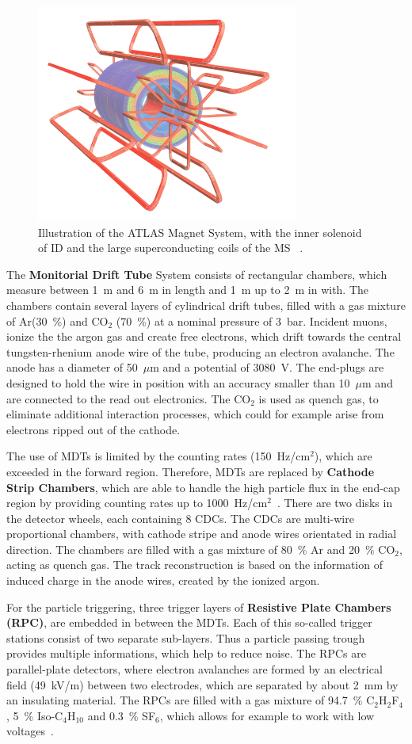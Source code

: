 \begin{figure}[h]
	\centering
	\includegraphics[width=0.4\linewidth]{Pics/cp3/37}
	\caption{Illustration of the ATLAS Magnet System, with the inner solenoid of ID and the large superconducting coils of the MS ~\cite{Aad:2008zzm}.} 
	\label{fig:37}
\end{figure}



 The \textbf{Monitorial Drift Tube} System consists of rectangular  chambers, which measure between 1~m and 6~m in length and 1~m up to 2~m in with. The chambers contain several layers of cylindrical drift tubes, filled with a gas mixture of Ar(30~\%) and CO$_2$ (70~\%) at a nominal  pressure of 3~bar. Incident muons, ionize the the argon gas and create free electrons, which drift towards the central tungsten-rhenium anode wire of the tube, producing an electron avalanche.  The anode has a diameter of 50~$\mu$m and a potential of 3080~V. The end-plugs are designed to hold the wire in position with an accuracy smaller than 10~$\mu$m and are connected to the read out electronics. The CO$_2$ is used as quench gas, to eliminate additional interaction processes, which could for example arise from electrons ripped out of the cathode. 

 The use of MDTs is limited by the counting rates (150~Hz/cm$^2$), which are exceeded in the forward region. Therefore, MDTs are replaced by \textbf{Cathode Strip Chambers}, which are able to handle the high particle flux in the end-cap region by providing counting rates up to 1000~Hz/cm$^2$~\cite{ATLAS:1999uwa}. There are two disks in the detector wheels, each containing 8 CDCs. The CDCs are multi-wire proportional chambers, with cathode stripe  and anode wires orientated in radial direction. The chambers are filled with a gas mixture of  80~\% Ar and 20~\% CO$_2$, acting as quench gas. The track reconstruction is based on the information of induced charge in the anode wires, created by the ionized argon.

 For the particle triggering, three trigger layers of \textbf{Resistive Plate Chambers (RPC)}, are embedded  in between the MDTs. Each of this so-called trigger stations consist of two separate sub-layers. Thus a particle passing trough provides multiple informations, which help to reduce noise.  The RPCs are parallel-plate detectors, where electron avalanches are formed by an electrical field (49~kV/m) between two electrodes, which are separated by about 2~mm by an insulating material. The RPCs are filled with a gas mixture of 94.7~\%   C$_2$H$_2$F$_4$, 5~\% Iso-C$_4$H$_{10}$ and 0.3~\% SF$_6$, which allows for example to work with  low voltages~\cite{ATLAS:1999uwa}. 

